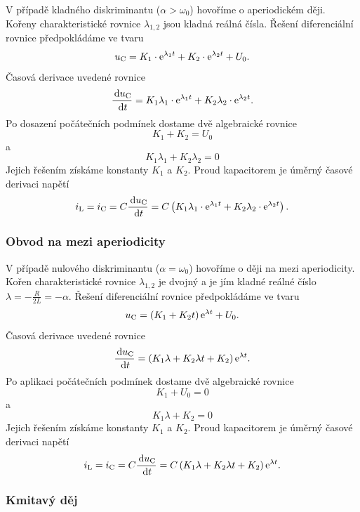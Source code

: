 V případě kladného diskriminantu ($\alpha > \omega_0$) hovoříme o aperiodickém ději. Kořeny charakteristické rovnice $\lambda_{1,2}$ jsou kladná reálná čísla. Řešení diferenciální rovnice předpokládáme ve tvaru
$$
u_\mathrm{C} = K_1 \cdot \mathrm{e}^{\lambda_1 t} + K_2 \cdot \mathrm{e}^{\lambda_2 t} + U_0.
$$
Časová derivace uvedené rovnice 
$$
\frac{\,\mathrm{d} u_\mathrm{C}}{\,\mathrm{d} t} = K_1 \lambda_1 \cdot \mathrm{e}^{\lambda_1 t} + K_2 \lambda_2 \cdot \mathrm{e}^{\lambda_2 t}.
$$
Po dosazení počátečních podmínek dostame dvě algebraické rovnice
$$
K_1 + K_2 = U_0
$$
a
$$
K_1 \lambda_1 + K_2 \lambda_2 = 0
$$
Jejich řešením získáme konstanty $K_1$ a $K_2$. Proud kapacitorem je úměrný časové derivaci napětí
$$
i_\mathrm{L} = i_\mathrm{C} = C \frac{\,\mathrm{d} u_\mathrm{C}}{\,\mathrm{d} t} = C \left( K_1 \lambda_1 \cdot \mathrm{e}^{\lambda_1 t} + K_2 \lambda_2 \cdot \mathrm{e}^{\lambda_2 t} \right).
$$

\subsubsection{Obvod na mezi aperiodicity}

V případě nulového diskriminantu ($\alpha = \omega_0$) hovoříme o ději na mezi aperiodicity. Kořen charakteristické rovnice $\lambda_{1,2}$ je dvojný a je jím kladné reálné číslo $\lambda = - \frac{R}{2L} = - \alpha$. Řešení diferenciální rovnice předpokládáme ve tvaru
$$
u_\mathrm{C} = \left( K_1 + K_2 t \right) \mathrm{e}^{\lambda t} + U_0.
$$
Časová derivace uvedené rovnice 
$$
\frac{\,\mathrm{d} u_\mathrm{C}}{\,\mathrm{d} t} = \left( K_1 \lambda + K_2 \lambda t + K_2 \right) \mathrm{e}^{\lambda t}.
$$
Po aplikaci počátečních podmínek dostame dvě algebraické rovnice
$$
K_1 + U_0 = 0
$$
a
$$
K_1 \lambda + K_2 = 0
$$
Jejich řešením získáme konstanty $K_1$ a $K_2$. Proud kapacitorem je úměrný časové derivaci napětí
$$
i_\mathrm{L} = i_\mathrm{C} = C \frac{\,\mathrm{d} u_\mathrm{C}}{\,\mathrm{d} t} = C \left( K_1 \lambda + K_2 \lambda t + K_2 \right) \mathrm{e}^{\lambda t} .
$$

\subsubsection{Kmitavý děj}

